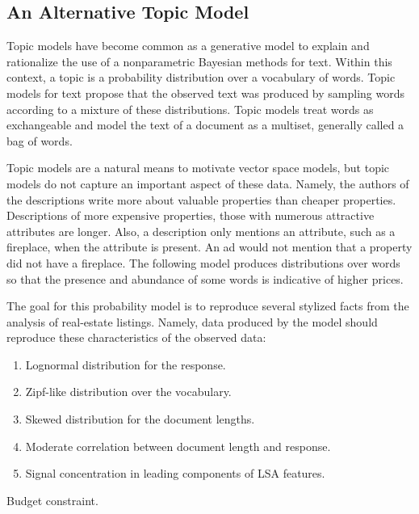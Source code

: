 \documentclass[12pt]{article}
\begin{document}
\subsection{ An Alternative Topic Model } %

Topic models have become common as a generative model to explain and rationalize the use of a nonparametric Bayesian methods for text.  Within this context, a topic is a probability distribution over a vocabulary of words.  Topic models for text propose that the observed text was produced by sampling words according to a mixture of these distributions. Topic models treat words as exchangeable and model the text of a document as a multiset, generally called a bag of words.

Topic models are a natural means to motivate vector space models, but topic models do not capture an important aspect of these data.  Namely, the authors of the descriptions write more about valuable properties than cheaper properties.  Descriptions of more expensive properties, those with numerous attractive attributes are longer.  Also, a description only mentions an attribute, such as a fireplace, when the attribute is present.  An ad would not mention that a property did not have a fireplace.  The following model produces distributions over words so that the presence and abundance of some words is indicative of higher prices.

The goal for this probability model is to reproduce several stylized facts from the analysis of real-estate listings.  Namely, data produced by the model should reproduce these characteristics of the observed data:
\begin{enumerate}
  \item Lognormal distribution for the response.
  \item Zipf-like distribution over the vocabulary.
  \item Skewed distribution for the document lengths.
  \item Moderate correlation between document length and response.
  \item Signal concentration in leading components of LSA features.
\end{enumerate}


\clearpage

Budget constraint.
\end{document}
